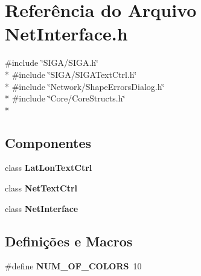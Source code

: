 \section{Referência do Arquivo Net\+Interface.\+h}
\label{_net_interface_8h}
{\ttfamily \#include \char`\"{}S\+I\+G\+A/\+S\+I\+G\+A.\+h\char`\"{}}\\*
{\ttfamily \#include \char`\"{}S\+I\+G\+A/\+S\+I\+G\+A\+Text\+Ctrl.\+h\char`\"{}}\\*
{\ttfamily \#include \char`\"{}Network/\+Shape\+Errors\+Dialog.\+h\char`\"{}}\\*
{\ttfamily \#include \char`\"{}Core/\+Core\+Structs.\+h\char`\"{}}\\*
\subsection*{Componentes}
\begin{DoxyCompactItemize}
\item 
class {\bf Lat\+Lon\+Text\+Ctrl}
\item 
class {\bf Net\+Text\+Ctrl}
\item 
class {\bf Net\+Interface}
\end{DoxyCompactItemize}
\subsection*{Definições e Macros}
\begin{DoxyCompactItemize}
\item 
\#define {\bf N\+U\+M\+\_\+\+O\+F\+\_\+\+C\+O\+L\+O\+RS}~10
\end{DoxyCompactItemize}
